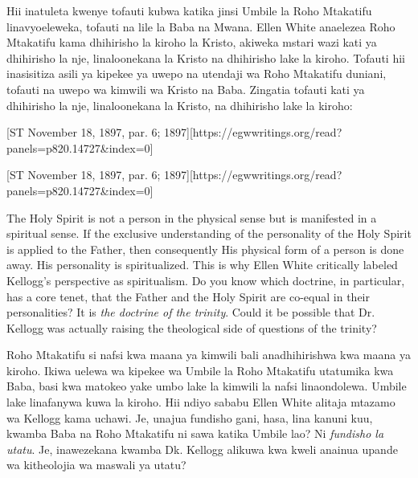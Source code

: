 Hii inatuleta kwenye tofauti kubwa katika jinsi Umbile la Roho Mtakatifu linavyoeleweka, tofauti na lile la Baba na Mwana. Ellen White anaelezea Roho Mtakatifu kama dhihirisho la kiroho la Kristo, akiweka mstari wazi kati ya dhihirisho la nje, linaloonekana la Kristo na dhihirisho lake la kiroho. Tofauti hii inasisitiza asili ya kipekee ya uwepo na utendaji wa Roho Mtakatifu duniani, tofauti na uwepo wa kimwili wa Kristo na Baba. Zingatia tofauti kati ya dhihirisho la nje, linaloonekana la Kristo, na dhihirisho lake la kiroho:


[ST November 18, 1897, par. 6; 1897][https://egwwritings.org/read?panels=p820.14727&index=0]


[ST November 18, 1897, par. 6; 1897][https://egwwritings.org/read?panels=p820.14727&index=0]


The Holy Spirit is not a person in the physical sense but is manifested in a spiritual sense. If the exclusive understanding of the personality of the Holy Spirit is applied to the Father, then consequently His physical form of a person is done away. His personality is spiritualized. This is why Ellen White critically labeled Kellogg's perspective as spiritualism. Do you know which doctrine, in particular, has a core tenet, that the Father and the Holy Spirit are co-equal in their personalities? It is \textit{the doctrine of the trinity}. Could it be possible that Dr. Kellogg was actually raising the theological side of questions of the trinity?


Roho Mtakatifu si nafsi kwa maana ya kimwili bali anadhihirishwa kwa maana ya kiroho. Ikiwa uelewa wa kipekee wa Umbile la Roho Mtakatifu utatumika kwa Baba, basi kwa matokeo yake umbo lake la kimwili la nafsi linaondolewa. Umbile lake linafanywa kuwa la kiroho. Hii ndiyo sababu Ellen White alitaja mtazamo wa Kellogg kama uchawi. Je, unajua fundisho gani, hasa, lina kanuni kuu, kwamba Baba na Roho Mtakatifu ni sawa katika Umbile lao? Ni \textit{fundisho la utatu}. Je, inawezekana kwamba Dk. Kellogg alikuwa kwa kweli anainua upande wa kitheolojia wa maswali ya utatu?


